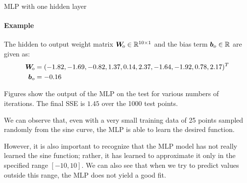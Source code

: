 \begin{frame}{MLP with one hidden layer}
\framesubtitle{Example}
    The hidden to output weight matrix ${\boldsymbol W}_{\!o} \in {\mathord{\mathbb R}}^{10 \times 1}$ and the bias term
    ${\boldsymbol b}_{o} \in {\mathord{\mathbb R}}$ are given as:
    \begin{align*}
        {\boldsymbol W}_{\!o} & = (-1.82,
       -1.69,
       -0.82,
       1.37,
       0.14,
       2.37,
       -1.64,
       -1.92,
       0.78,
       2.17)^T\\
       {\boldsymbol b}_{o} & = -0.16
    \end{align*}


    Figures 
show the output of the MLP on the test for various numbers of iterations.
The final SSE is $1.45$ over the 1000 test points.


\medskip 
    
    We
    can observe that, even with a very small training data of 25 points
    sampled randomly from the sine curve, the MLP is able to learn the
    desired function. 

\medskip

However, it is also important to recognize that
    the MLP model has not really learned the sine function; rather, it
    has learned to approximate it only in the specified
    range $[-10,10]$. We can also see %
    that when we try to predict values outside this range, the MLP does
    not yield a good fit.
    \label{ex:reg:neural:mlp_sine}
\end{frame}
%
%
